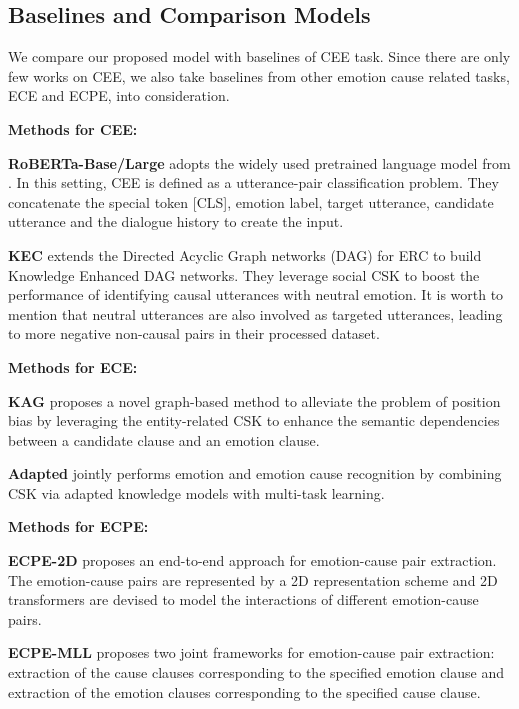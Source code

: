\documentclass[letterpaper]{article} \usepackage{aaai23}  \usepackage{times}  \usepackage{helvet}  \usepackage{courier}  \usepackage[hyphens]{url}  \usepackage{graphicx} \urlstyle{rm} \def\UrlFont{\rm}  \usepackage{natbib}  \usepackage{caption} \frenchspacing  \setlength{\pdfpagewidth}{8.5in} \setlength{\pdfpageheight}{11in} \usepackage{algorithm}
\begin{document}
\subsection{Baselines and Comparison Models}
We compare our proposed model with baselines of CEE task. Since there are only few works on CEE, we also take baselines from other emotion cause related tasks, ECE and ECPE, into consideration.

{
\setlength{\parindent}{0cm}
\textbf{Methods for CEE:}
}

\textbf{RoBERTa-Base/Large} \cite{reccon} adopts the widely used pretrained language model from \cite{roberta}. In this setting, CEE is defined as a utterance-pair classification problem. They concatenate the special token [CLS], emotion label, target utterance, candidate utterance and the dialogue history to create the input.

\textbf{KEC} \cite{kec} extends the Directed Acyclic Graph networks (DAG) for ERC \cite{dag-erc} to build Knowledge Enhanced DAG networks. They leverage social CSK to boost the performance of identifying causal utterances with neutral emotion. It is worth to mention that neutral utterances are also involved as targeted utterances, leading to more negative non-causal pairs in their processed dataset. 

{
\setlength{\parindent}{0cm}
\textbf{Methods for ECE:}
}

\textbf{KAG} \cite{kag} proposes a novel graph-based method to alleviate the problem of position bias by leveraging the entity-related CSK to enhance the semantic dependencies between a candidate clause and an emotion clause.

\textbf{Adapted} \cite{adapted} jointly performs emotion and emotion cause recognition by combining CSK via adapted knowledge models with multi-task learning.

{
\setlength{\parindent}{0cm}
\textbf{Methods for ECPE:}
}

\textbf{ECPE-2D} \cite{ecpe-2d} proposes an end-to-end approach for emotion-cause pair extraction. The emotion-cause pairs are represented by a 2D representation scheme and 2D transformers are devised to model the interactions of different emotion-cause pairs.

\textbf{ECPE-MLL} \cite{ecpe-mll} proposes two joint frameworks for emotion-cause pair extraction: extraction of the cause clauses corresponding to the specified emotion clause and extraction of the emotion clauses corresponding to the specified cause clause.
\end{document}
